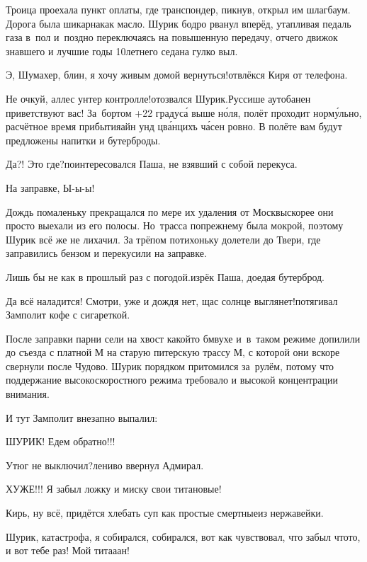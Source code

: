 Троица проехала пункт оплаты, где транспондер, пикнув, открыл им шлагбаум. Дорога была шикарна\mdash как масло. Шурик бодро рванул вперёд, утапливая педаль газа в~пол и~поздно переключаясь на повышенную передачу, отчего движок знавшего и лучшие годы 10\sdash летнего седана гулко выл. 

\diagdash Э, Шумахер, блин, я хочу живым домой вернуться!\mdash отвлёкся Киря от телефона.

\diagdash Не очкуй, аллес унтер контролле!\mdash отозвался Шурик.\mdash Руссише аутобанен приветствуют вас! За~бортом +22 градус\'{а} выше н\'{о}ля, полёт проходит норм\'{у}льно, расчётное время прибытия\mdash айн унд цв\'{а}нцихъ ч\'{а}сен ровно. В полёте вам будут предложены напитки и бутерброды.

\diagdash Да?! Это где?\mdash поинтересовался Паша, не взявший с собой перекуса.

\diagdash На заправке, Ы-ы-ы!

Дождь помаленьку прекращался по мере их удаления от Москвы\mdash скорее они просто выехали из его полосы. Но~трасса по\sdash прежнему была мокрой, поэтому Шурик всё же не лихачил. За трёпом потихоньку долетели до Твери, где заправились бензом и перекусили на заправке.

\diagdash Лишь бы не как в прошлый раз с погодой.\mdash изрёк Паша, доедая бутерброд.

\diagdash Да всё наладится! Смотри, уже и дождя нет, щас солнце выглянет!\mdash потягивал Замполит кофе с сигареткой.

После заправки парни сели на хвост какой\sdash то бмв\sdash ухе и~в~таком режиме допилили до съезда с платной М на старую питерскую трассу М, с которой они вскоре свернули после Чудово. Шурик порядком притомился за~рулём, потому что поддержание высокоскоростного режима требовало и высокой концентрации внимания. 

И тут Замполит внезапно выпалил:

\diagdash ШУРИК! Едем обратно!!!

\diagdash Утюг не выключил?\mdash лениво ввернул Адмирал.

\diagdash ХУЖЕ!!! Я забыл ложку и миску свои титановые!

\diagdash Кирь, ну всё, придётся хлебать суп как простые смертные\mdash из нержавейки.

\diagdash Шурик, катастрофа, я собирался, собирался, вот как чувствовал, что забыл что\sdash то, и вот тебе раз! Мой тита\sdash а\sdash ан!

